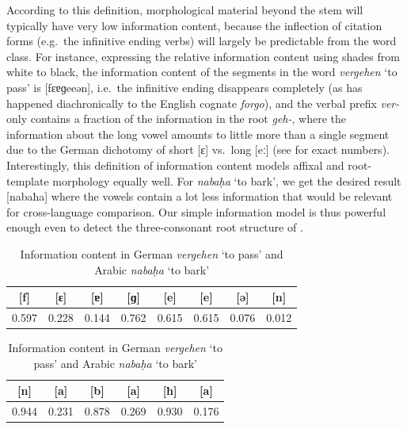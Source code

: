 According to this definition, morphological material beyond the stem will typically have very low information content, because the inflection of citation forms (e.g.\ the infinitive ending verbs) will largely be predictable from the word class. For instance, expressing the relative information content using shades from white to black, the information content of the segments in the  word \textit{vergehen} `to pass' is [{\color[rgb]{0.403,0.403,0.403}f}{\color[rgb]{0.772,0.772,0.772}ɛ}{\color[rgb]{0.856,0.856,0.856}ɐ}{\color[rgb]{0.238,0.238,0.238}ɡ}{\color[rgb]{0.485,0.485,0.485}e}{\color[rgb]{0.485,0.485,0.485}e}{\color[rgb]{0.924,0.924,0.924}ə}{\color[rgb]{0.988,0.988,0.988}n}], i.e.\ the infinitive ending disappears completely (as has happened diachronically to the English cognate \textit{forgo}), and the verbal prefix \textit{ver-} only contains a fraction of the information in the root \textit{geh-}, where the information about the long vowel amounts to little more than a single segment due to the German dichotomy of short [ɛ] vs.\ long [eː] (see  for exact numbers). Interestingly, this definition of information content models affixal and root-template morphology equally well. For  \textit{nabaḥa} `to bark', we get the desired result [{\color[rgb]{0.056,0.056,0.056}n}{\color[rgb]{0.769,0.769,0.769}a}{\color[rgb]{0.122,0.122,0.122}b}{\color[rgb]{0.731,0.731,0.731}a}{\color[rgb]{0.070,0.070,0.070}ħ}{\color[rgb]{0.814,0.814,0.814}a}] where the vowels contain a lot less information that would be relevant for cross-language comparison. Our simple information model is thus powerful enough even to detect the three-consonant root structure of .

\begin{table}
\centering
\begin{tabular}{cccccccc}
[f] & [ɛ] & [ɐ] & [ɡ] & [e] & [e] & [ə] & [n]\\ \hline
0.597 & 0.228 & 0.144 & 0.762 & 0.615 & 0.615 & 0.076 & 0.012\\
\end{tabular}
\vspace*{5mm}

\begin{tabular}{cccccc}
[n] & [a] & [b] & [a] & [ħ] & [a] \\ \hline
0.944 & 0.231 & 0.878 & 0.269 & 0.930 & 0.176\\
\end{tabular}\vspace*{0.5cm}
\caption{Information content in German \textit{vergehen} \textnormal{`to pass'} and Arabic \textit{nabaḥa} \textnormal{`to bark'}}
\label{t:info-content-model}
\end{table}

